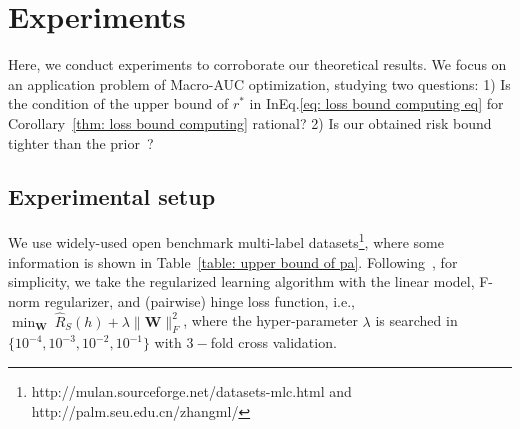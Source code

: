 \documentclass{article}
\def\mW{{\mathbf{W}}}
\begin{document}
    



\section{Experiments} 
\label{section: C}
Here, we conduct experiments to corroborate our theoretical results. We focus on an application problem of Macro-AUC optimization, studying two questions: 1) Is the condition of the upper bound of $r^*$ in InEq.\eqref{eq: loss bound computing eq} for Corollary~\ref{thm: loss bound computing} rational? 2) Is our obtained risk bound tighter than the prior~\cite{wu2023macro-auc}? 

\subsection{Experimental setup}



We use widely-used open benchmark multi-label datasets\footnote{http://mulan.sourceforge.net/datasets-mlc.html and http://palm.seu.edu.cn/zhangml/}, where some information is shown in Table~\ref{table: upper bound of pa}. Following~\cite{wu2023macro-auc}, for simplicity, we take the regularized learning algorithm with the linear model, F-norm regularizer, and (pairwise) hinge loss function, i.e., $\min_{\mW} \ \widehat{R}_{S}(h) + \lambda \| \mW \|_F^2$, where the hyper-parameter $\lambda$ is searched in $\{ 10^{-4},10^{-3},10^{-2},10^{-1} \}$ with $3-$fold cross validation.
\end{document}
